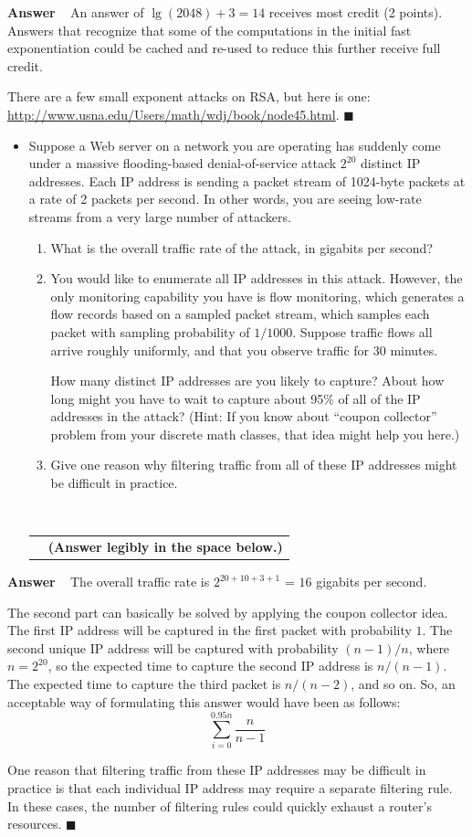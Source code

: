 \documentclass[11pt]{article}
\newcounter{pctr}
\newcommand{\ansbelow}{\probnote{Answer legibly in the space below.}}
\newcommand{\sols}[1]{#1}
\newcommand{\sols}[1]{}
\newcounter{answer}
\newenvironment{answer}[1][\relax]{\refstepcounter{answer}\begin{list}%
 {}{\leftmargin 0pt\rightmargin 0pt\labelsep 3pt\parsep 0pt%
 \setlength{\listparindent}{\parindent}}
    \item {\bf Answer \theanswer #1}\
    }{\hspace*{\fill}$\blacksquare$\end{list}}
\newcommand\prob[1]%
  {\begin{itemize}\item[]%
   \vspace{.2in}{\bf\thepctr. ~[#1~ points]:}\stepcounter{pctr}}
\newcommand\eprob{\end{itemize}}
\newcommand\probnote[1]%
  {\\\begin{tabular}{cr} \hspace{3in} & {\bf (#1)} \\ \end{tabular}}
\begin{document}
\sols{
\vspace{-1.25in}
\begin{answer}
An answer of $\lg(2048) + 3 = 14$ receives most credit (2 points).
Answers that recognize that some of the computations in the initial fast
exponentiation could be cached and re-used to reduce this further
receive full credit.

There are a few small exponent attacks on RSA, but here is one: \\
\url{http://www.usna.edu/Users/math/wdj/book/node45.html}. 
\end{answer}
}


\newpage
\prob{8} Suppose a Web server on a network you are operating has
suddenly come under a massive flooding-based denial-of-service attack
$2^{20}$ distinct IP addresses.  Each IP address is sending a packet
stream of 1024-byte packets at a rate of 2 packets per second.  In other
words, you are seeing low-rate streams from a very large number of
attackers.
\begin{enumerate}
\item What is the overall traffic rate of the attack, in gigabits per second?
\item You would like to enumerate all IP addresses in this attack.
  However, the only monitoring capability you have is flow
  monitoring, which generates a flow records based on a sampled packet
  stream, which samples each packet with sampling probability of
  $1/1000$.  Suppose traffic flows all arrive roughly uniformly, and
  that you observe traffic for 30 minutes.  

  How many distinct IP addresses are you likely to capture?  About how
  long might you have to wait to capture about 95\% of all of the IP
  addresses in the attack? (Hint: If you know about ``coupon collector''
  problem from your discrete math classes, that idea might help you
  here.)
\item Give one reason why filtering traffic from all of these IP
  addresses might be difficult in practice.
\end{enumerate}
~\ansbelow
\vspace{1.25in}
\eprob

\sols{
\vspace{-1.25in}
\begin{answer}
The overall traffic rate is $2^{20+10+3+1}$ = $16$ gigabits per second.

The second part can basically be solved by applying the coupon collector
idea.  The first IP address will be captured in the first packet with
probability $1$.  The second unique IP address will be captured with
probability $(n-1)/n$, where $n=2^{20}$, so the expected time to capture
the second IP address is $n/(n-1)$.  The expected time to capture the
third packet is $n/(n-2)$, and so on.  So, an acceptable way of
formulating this answer would have been as follows:
\[
\sum_{i=0}^{0.95n} \frac{n}{n-1}
\]

One reason that filtering traffic from these IP addresses may be
difficult in practice is that each individual IP address may require a
separate filtering rule.  In these cases, the number of filtering rules
could quickly exhaust a router's resources.
\end{answer}
}
\end{document}
